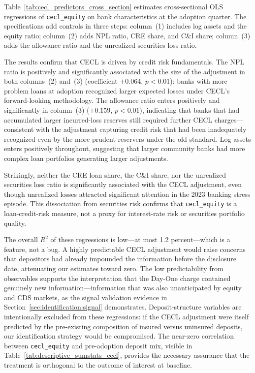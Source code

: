 Table~\ref{tab:cecl_predictors_cross_section} estimates cross-sectional OLS
regressions of \texttt{cecl\_equity} on bank characteristics at the adoption
quarter. The specifications add controls in three steps: column~(1) includes
log assets and the equity ratio; column~(2) adds NPL ratio, CRE share, and
C\&I share; column~(3) adds the allowance ratio and the unrealized
securities loss ratio.

The results confirm that CECL is driven by credit risk fundamentals. The NPL
ratio is positively and significantly associated with the size of the adjustment
in both columns~(2) and~(3) (coefficient $+0.064$, $p < 0.01$): banks with
more problem loans at adoption recognized larger expected losses under CECL's
forward-looking methodology. The allowance ratio enters positively and
significantly in column~(3) ($+0.159$, $p < 0.01$), indicating that banks
that had accumulated larger incurred-loss reserves still required further CECL
charges---consistent with the adjustment capturing credit risk that had been
inadequately recognized even by the more prudent reservers under the old
standard. Log assets enters positively throughout, suggesting that larger
community banks had more complex loan portfolios generating larger adjustments.

Strikingly, neither the CRE loan share, the C\&I share, nor the unrealized
securities loss ratio is significantly associated with the CECL adjustment,
even though unrealized losses attracted significant attention in the 2023 banking
stress episode. This dissociation from securities risk confirms that
\texttt{cecl\_equity} is a loan-credit-risk measure, not a proxy for
interest-rate risk or securities portfolio quality.

The overall $R^2$ of these regressions is low---at most 1.2 percent---which is
a feature, not a bug. A highly predictable CECL adjustment would raise concerns
that depositors had already impounded the information before the disclosure date,
attenuating our estimates toward zero. The low predictability from observables
supports the interpretation that the Day-One charge contained genuinely new
information---information that was also unanticipated by equity and CDS markets,
as the signal validation evidence in Section~\ref{sec:identification:signal}
demonstrates. Deposit-structure variables are intentionally excluded from these
regressions: if the CECL adjustment were itself predicted by the pre-existing
composition of insured versus uninsured deposits, our identification strategy
would be compromised. The near-zero correlation between \texttt{cecl\_equity}
and pre-adoption deposit mix, visible in Table~\ref{tab:descriptive_sumstats_cecl},
provides the necessary assurance that the treatment is orthogonal to the outcome
of interest at baseline.
